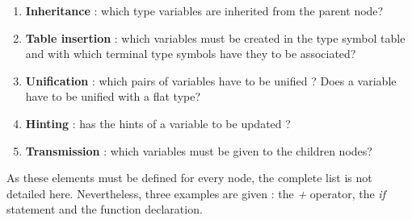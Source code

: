 \documentclass[a4paper,11pt]{article}
\begin{document}
\begin{enumerate}
	\item \textbf{Inheritance} : which type variables are inherited from the parent node?
	\item \textbf{Table insertion} : which variables must be created in the type symbol table and with which terminal type symbols have they to be associated?
	\item \textbf{Unification} : which pairs of variables have to be unified ? Does a variable have to be unified with a flat type?
	\item \textbf{Hinting} : has the hints of a variable to be updated ? 
	\item \textbf{Transmission} : which variables must be given to the children nodes?
\end{enumerate} 
As these elements must be defined for every node, the complete list is not detailed here. Nevertheless, three examples are given : the \textit{+} operator, the \textit{if} statement and the function declaration. 
\end{document}
